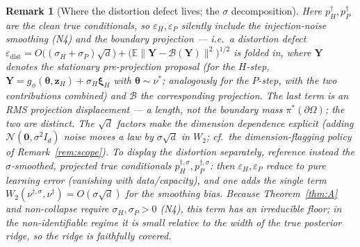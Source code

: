 \documentclass[11pt]{article}
\theoremstyle{definitionbreak}
\theoremstyle{plainbreak}
\theoremstyle{remarkbreak}
\newtheorem{remark}{Remark}[section]
\newcommand{\E}{\mathbb{E}}
\newcommand{\Om}{\Omega}
\newcommand{\Normal}{\mathcal{N}}
\newcommand{\bth}{\bm{\theta}}
\newcommand{\norm}[1]{\lVert #1 \rVert}
\begin{document}
\begin{remark}[Where the distortion defect lives; the $\sigma$ decomposition]
\label{rem:edist}
Here $p^\dagger_H,p^\dagger_P$ are the \emph{clean} true conditionals, so $\varepsilon_H,\varepsilon_P$
silently include the injection-noise smoothing (N4) and the boundary projection --- i.e.\ a distortion
defect
$\varepsilon_{\mathrm{dist}}=O\big((\sigma_H+\sigma_P)\sqrt{d}\big)+\big(\E\norm{\bm Y-\mathcal B(\bm Y)}^2\big)^{1/2}$
is folded in, where $\bm Y$ denotes the stationary \emph{pre-projection} proposal (for the $H$-step,
$\bm Y=g_\phi(\bth,\bm z_H)+\sigma_H\bm\xi_H$ with $\bth\sim\nu^\ast$; analogously for the $P$-step,
with the two contributions combined) and $\mathcal B$ the corresponding projection. The last term is
an RMS projection \emph{displacement} --- a length, not the boundary \emph{mass}
$\pi^\ast(\partial\Om)$; the two are distinct. The $\sqrt d$ factors make the dimension dependence
explicit (adding $\Normal(\bm0,\sigma^2I_d)$ noise moves a law by $\sigma\sqrt d$ in $W_2$; cf.\ the
dimension-flagging policy of Remark~\ref{rem:scope}). To display the distortion separately, reference
instead the $\sigma$-smoothed, projected true conditionals $p^{\dagger,\sigma}_H,p^{\dagger,\sigma}_P$:
then $\varepsilon_H,\varepsilon_P$ reduce to pure learning error (vanishing with data/capacity), and
one adds the single term $W_2(\nu^{\dagger,\sigma},\nu^\dagger)=O(\sigma\sqrt d)$ for the smoothing
bias. Because Theorem~\ref{thm:A} and non-collapse require $\sigma_H,\sigma_P>0$ (N4), this term has
an irreducible floor; in the non-identifiable regime it is small relative to the width of the true
posterior ridge, so the ridge is faithfully covered.
\end{remark}
\end{document}
